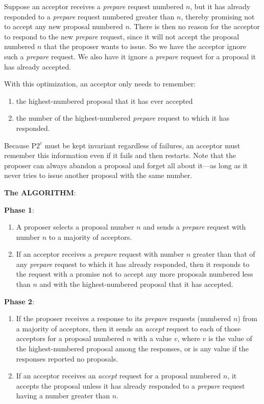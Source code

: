 \documentclass[11pt]{article}
\begin{document}
Suppose an acceptor receives a \emph{prepare} request numbered \(n\), but it has already responded to a
\emph{prepare} request numbered greater than \(n\), thereby promising not to accept any new proposal numbered
\(n\). There is then no reason for the acceptor to respond to the new \emph{prepare} request, since it will
not accept the proposal numbered \(n\) that the proposer wants to issue. So we have the acceptor
ignore such a \emph{prepare} request. We also have it ignore a \emph{prepare} request for a proposal it has already
accepted.

With this optimization, an acceptor only needs to remember:
\begin{enumerate}
\item the highest-numbered proposal that it has ever accepted
\item the number of the highest-numbered \emph{prepare} request to which it has responded.
\end{enumerate}
Because P\(2^c\) must be kept invariant regardless of failures, an acceptor must remember this
information even if it fails and then restarts. Note that the proposer can always abandon a proposal
and forget all about it—as long as it never tries to issue another proposal with the same number.

\textbf{The ALGORITHM}:

\textbf{Phase 1}:
\begin{enumerate}
\item A proposer selects a proposal number \(n\) and sends a \emph{prepare} request with number \(n\) to a majority of acceptors.
\item If an acceptor receives a \emph{prepare} request with number \(n\) greater than that of any \emph{prepare}
request to which it has already responded, then it responds to the request with a promise not to
accept any more proposals numbered less than \(n\) and with the highest-numbered proposal that it
has accepted.
\end{enumerate}


\textbf{Phase 2}:
\begin{enumerate}
\item If the proposer receives a response to its \emph{prepare} requests (numbered \(n\)) from a majority of
acceptors, then it sends an \emph{accept} request to each of those acceptors for a proposal numbered \(n\)
with a value \(v\), where \(v\) is the value of the highest-numbered proposal among the responses,
or is any value if the responses reported no proposals.
\item If an acceptor receives an \emph{accept} request for a proposal numbered \(n\), it accepts the proposal
unless it has already responded to a \emph{prepare} request having a number greater than \(n\).
\end{enumerate}
\end{document}
